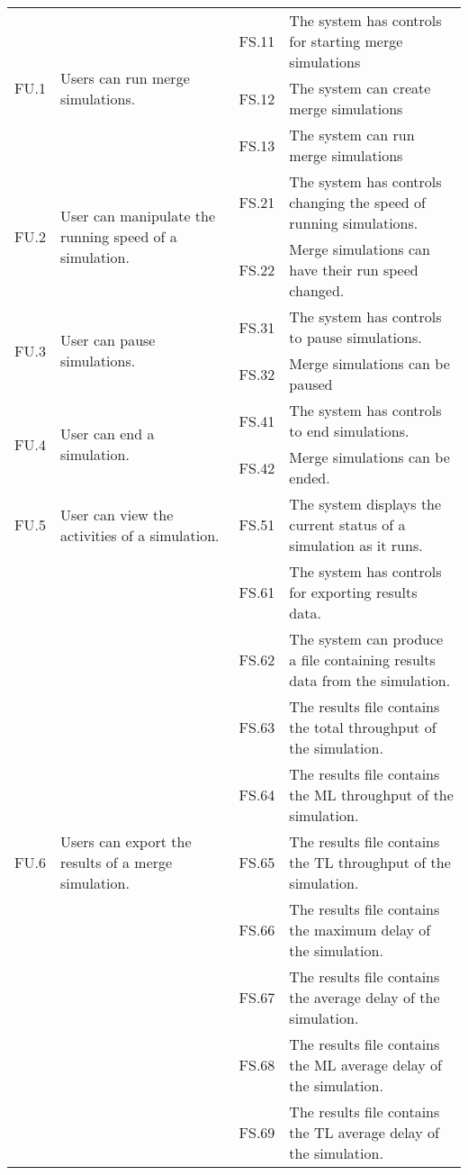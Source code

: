 \begin{appendices}
\begin{longtable}{|p{0.1\linewidth}|p{0.4\linewidth}|p{0.1\linewidth}|p{0.4\linewidth}|}
\multirow{3}{*}{FU.1} & \multirow{3}{*}{\parbox{\linewidth}{Users can run merge simulations.}} 
 & FS.11 & The system has controls for starting merge simulations \\
 &  & FS.12 & The system can create merge simulations \\
 &  & FS.13 & The system can run merge simulations \\
\hline
\multirow{2}{*}{FU.2} & \multirow{2}{*}{\parbox{\linewidth}{User can manipulate the running speed of a simulation.}}
 & FS.21 & The system has controls changing the speed of running simulations. \\
 &  & FS.22 & Merge simulations can have their run speed changed. \\ 
\hline
\multirow{2}{*}{FU.3} & \multirow{2}{*}{\parbox{\linewidth}{User can pause simulations.}}
 & FS.31 & The system has controls to pause simulations. \\
 &  & FS.32 & Merge simulations can be paused \\ 
\hline
\multirow{2}{*}{FU.4} & \multirow{2}{*}{\parbox{\linewidth}{User can end a simulation.}}
 & FS.41 & The system has controls to end simulations. \\
 &  & FS.42 & Merge simulations can be ended. \\ 
\hline
FU.5 & User can view the activities of a simulation. & FS.51 & The system displays the current status of a simulation as it runs. \\
\hline
\multirow{9}{*}{FU.6} & \multirow{9}{*}{\parbox{\linewidth}{Users can export the results of a merge simulation.}}
 & FS.61 & The system has controls for exporting results data. \\
 &  & FS.62 & The system can produce a file containing results data from the simulation. \\
 &  & FS.63 & The results file contains the total throughput of the simulation. \\
 &  & FS.64 & The results file contains the ML throughput of the simulation. \\
 &  & FS.65 & The results file contains the TL throughput of the simulation. \\
 &  & FS.66 & The results file contains the maximum delay of the simulation. \\
 &  & FS.67 & The results file contains the average delay of the simulation. \\
 &  & FS.68 & The results file contains the ML average delay of the simulation. \\
 &  & FS.69 & The results file contains the TL average delay of the simulation. \\

\end{longtable}
\end{appendices}
